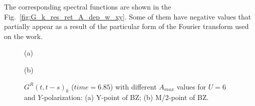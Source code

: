 The corresponding spectral functions are shown in the Fig.~\ref{fig:G_k_res_ret_A_dep_w_xy}. Some of them have negative values \citep{PhysRevB.71.085104,PhysRevB.73.209902,PhysRevB.80.115119,PhysRevLett.112.176404} that partially appear as a result of the particular form of the Fourier transform used on the work.
\begin{figure}[ht]
\begin{minipage}[h]{0.5\linewidth}
 (a) \\
\end{minipage}
\hfill
\begin{minipage}[h]{0.5\linewidth}
 (b) \\
\end{minipage}
\caption{$G^{R}(t,t-s)_k$ ($time=6.85$) with different $A_{max}$ values for $U=6$ and $Y$-polarization: (a) Y-point of BZ; (b) M/2-point of BZ.}
\label{fig:G_k_res_ret_A_dep_y}
\end{figure}

